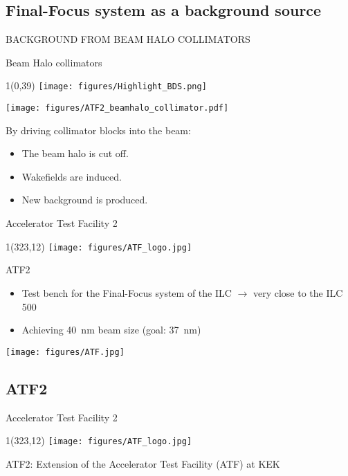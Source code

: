\documentclass[xcolor={dvipsnames}]{beamer}
\newcommand{\atflogo}{
  \setlength{\TPHorizModule}{1pt}
  \setlength{\TPVertModule}{1pt}
  \begin{textblock}{1}(323,12)
   \texttt{[image: figures/ATF\_logo.jpg]}
  \end{textblock}
}
\newcommand{\BDSsymbol}{
  \setlength{\TPHorizModule}{1pt}
  \setlength{\TPVertModule}{1pt}
  \begin{textblock}{1}(0,39)
   \texttt{[image: figures/Highlight\_BDS.png]}
  \end{textblock}
}
\begin{document}
\subsection{Final-Focus system as a background source}
\begin{frame}
 \begin{center}
  \alert{\MakeUppercase{Background from Beam Halo collimators}}
 \end{center}
\end{frame}

\begin{frame}{Beam Halo collimators}
\BDSsymbol
 \begin{center}
\texttt{[image: figures/ATF2\_beamhalo\_collimator.pdf]}
\end{center}
By driving collimator blocks into the beam:\\
\begin{itemize}
 \item The beam halo is cut off.
 \item Wakefields are induced.
 \item New background is produced.
\end{itemize}
\end{frame}

\begin{frame}{Accelerator Test Facility 2}
\atflogo
ATF2
\begin{itemize}
\item Test bench for the Final-Focus system of the ILC $\rightarrow$ very close to the ILC 500
\item Achieving \SI{40}{\nano\metre} beam size (goal: \SI{37}{\nano\metre})
\end{itemize}
\vspace*{0.3cm}
\begin{center}
 \texttt{[image: figures/ATF.jpg]}
\end{center}
\end{frame}

\subsection{ATF2}
\begin{frame}{Accelerator Test Facility 2}
\atflogo
ATF2: Extension of the Accelerator Test Facility (ATF) at KEK
\vspace*{0.3cm}
\begin{center}
\end{center}
\end{frame}
\end{document}
